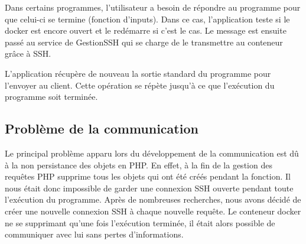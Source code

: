 \par Dans certains programmes, l'utilisateur a besoin de répondre au programme pour que celui-ci se termine (fonction d'inputs). Dans ce cas, l'application teste si le docker est encore ouvert et le redémarre si c'est le cas. Le message est ensuite passé au service de GestionSSH qui se charge de le transmettre au conteneur grâce à SSH.

\par L'application récupère de nouveau la sortie standard du programme pour l'envoyer au client. Cette opération se répète jusqu'à ce que l'exécution du programme soit terminée.

\subsection{Problème de la communication}

\par Le principal problème apparu lors du développement de la communication est dû à la non persistance des objets en PHP. En effet, à la fin de la gestion des requêtes PHP supprime tous les objets qui ont été créés pendant la fonction. Il nous était donc impossible de garder une connexion SSH ouverte pendant toute l'exécution du programme. Après de nombreuses recherches, nous avons décidé de créer une nouvelle connexion SSH à chaque nouvelle requête. Le conteneur docker ne se supprimant qu'une fois l'exécution terminée, il était alors possible de communiquer avec lui sans pertes d'informations.

\par %